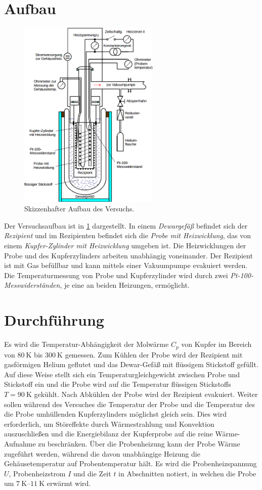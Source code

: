 \section{Aufbau}
\begin{figure}
	\centering
	\includegraphics[width=0.6\textwidth,]{graphics/aufbau.png}
	\caption{Skizzenhafter Aufbau des Versuchs. \cite{skript}}
	\label{fig:aufbau}
\end{figure}
Der Versuchsaufbau ist in \ref{fig:aufbau} dargestellt.
In einem \emph{Dewargefäß} befindet sich der \emph{Rezipient} und im Rezipienten befindet sich die \emph{Probe mit Heizwicklung}, das von einem \emph{Kupfer-Zylinder mit Heizwicklung} umgeben ist.
Die Heizwicklungen der Probe und des Kupferzylinders arbeiten unabhängig voneinander.
Der Rezipient ist mit Gas befüllbar und kann mittels einer Vakuumpumpe evakuiert werden. 
Die Temperaturmessung von Probe und Kupferzylinder wird durch zwei \emph{Pt-100-Messwiderständen}, je eine an beiden Heizungen, ermöglicht.


\section{Durchführung}
Es wird die Temperatur-Abhängigkeit der Molwärme $C_p$ von Kupfer im
Bereich von $\SI{80}{\kelvin}$ bis $\SI{300}{\kelvin}$ gemessen.
Zum Kühlen der Probe wird der Rezipient mit gasförmigen Helium geflutet
und das Dewar-Gefäß mit flüssigem Stickstoff gefüllt.
Auf diese Weise stellt sich ein Temperaturgleichgewicht zwischen Probe und Stickstoff ein und die Probe wird auf die Temperatur flüssigen Stickstoffs $T=\SI{90}{\kelvin}$ \cite{stickstoff} gekühlt.
Nach Abkühlen der Probe wird der Rezipient evakuiert.
Weiter sollen während des Versuches die Temperatur der Probe und die Temperatur des die Probe umhüllenden Kupferzylinders möglichst gleich sein.
Dies wird erforderlich, um Störeffekte durch Wärmestrahlung und Konvektion auszuschließen und die Energiebilanz der Kupferprobe auf die reine Wärme-Aufnahme zu beschränken. 
Über die Probenheizung kann der Probe Wärme zugeführt werden, 
während die davon unabhängige Heizung die Gehäusetemperatur auf Probentemperatur hält.
Es wird die Probenheizspannung $U$, Probenheizstrom $I$ und die Zeit $t$ in Abschnitten notiert, 
in welchen die Probe um $\SIrange{7}{11}{\kelvin}$ erwärmt wird.